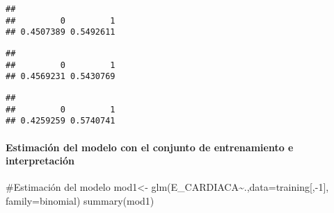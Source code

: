 \documentclass[
]{article}
\newenvironment{Shaded}{\begin{snugshade}}{\end{snugshade}}
\newcommand{\AttributeTok}[1]{\textcolor[rgb]{0.80,0.80,0.80}{#1}}
\newcommand{\CommentTok}[1]{\textcolor[rgb]{0.50,0.62,0.50}{#1}}
\newcommand{\DecValTok}[1]{\textcolor[rgb]{0.86,0.86,0.80}{#1}}
\newcommand{\FunctionTok}[1]{\textcolor[rgb]{0.94,0.94,0.56}{#1}}
\newcommand{\NormalTok}[1]{\textcolor[rgb]{0.80,0.80,0.80}{#1}}
\newcommand{\OtherTok}[1]{\textcolor[rgb]{0.94,0.94,0.56}{#1}}
\newcommand{\SpecialCharTok}[1]{\textcolor[rgb]{0.86,0.64,0.64}{#1}}
\begin{document}
\begin{verbatim}
## 
##         0         1 
## 0.4507389 0.5492611
\end{verbatim}

\begin{Shaded}
\end{Shaded}

\begin{verbatim}
## 
##         0         1 
## 0.4569231 0.5430769
\end{verbatim}

\begin{Shaded}
\end{Shaded}

\begin{verbatim}
## 
##         0         1 
## 0.4259259 0.5740741
\end{verbatim}

\hypertarget{estimaciuxf3n-del-modelo-con-el-conjunto-de-entrenamiento-e-interpretaciuxf3n}{%
\paragraph{Estimación del modelo con el conjunto de entrenamiento e
interpretación}\label{estimaciuxf3n-del-modelo-con-el-conjunto-de-entrenamiento-e-interpretaciuxf3n}}

\begin{Shaded}
\begin{Highlighting}[]
\CommentTok{\#Estimación del modelo}
\NormalTok{mod1}\OtherTok{\textless{}{-}} \FunctionTok{glm}\NormalTok{(E\_CARDIACA}\SpecialCharTok{\textasciitilde{}}\NormalTok{.,}\AttributeTok{data=}\NormalTok{training[,}\SpecialCharTok{{-}}\DecValTok{1}\NormalTok{], }\AttributeTok{family=}\NormalTok{binomial)}
\FunctionTok{summary}\NormalTok{(mod1)}
\end{Highlighting}
\end{Shaded}
\end{document}
